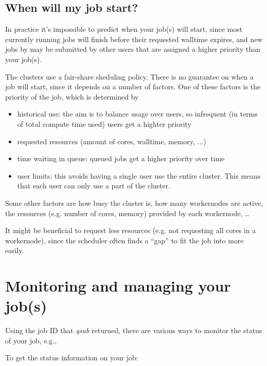 \ifgent
\subsection{When will my job start?}
\label{subsec:priority}
In practice it's impossible to predict when your job(s) will start,
since most currently running jobs will finish before their requested walltime
expires, and new jobs by may be submitted by other users that are assigned a higher
priority than your job(s).

The \hpcInfra clusters use a fair-share sheduling policy. There is no guarantee on when a
job will start, since it depends on a number of factors. One of these factors is
the priority of the job, which is determined by
\begin{itemize}
    \item historical use: the aim is to balance usage over users, so
        infrequent (in terms of total compute time used) users get a highter priority

    \item requested resources (amount of cores, walltime, memory, ...)

    \item time waiting in queue: queued jobs get a higher priority over time

    \item user limits: this avoids having a single user use the entire cluster.
        This means that each user can only use a part of the cluster.

\end{itemize}
Some other factors are how busy the cluster is, how many workernodes are active,
the resources (e.g. number of cores, memory) provided by each workernode, \ldots

It might be beneficial to request less resources (e.g. not requesting all cores
in a workernode), since the scheduler often finds a ``gap'' to fit the job into
more easily.
\fi


\section{Monitoring and managing your job(s)}

Using the job ID that \textit{qsub} returned, there are various ways to monitor
the status of your job, e.g.,

To get the status information on your job:

\begin{prompt}
\end{prompt}

